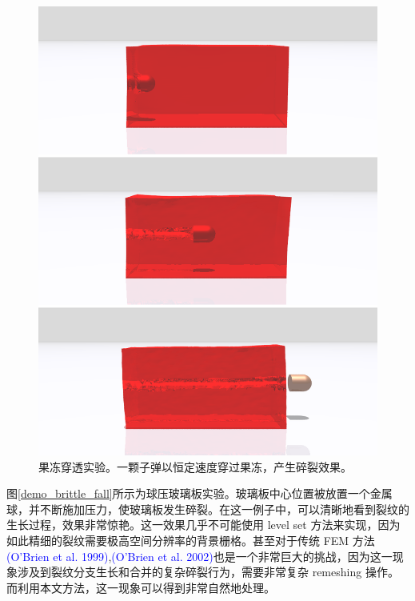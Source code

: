 \begin{figure}[htbp]
\begin{minipage}[t]{0.45\textwidth}
  \includegraphics[width=0.9\linewidth]{chap/image/demo_jello}
  \caption{\label{demo_jello}
           果冻穿透实验。一颗子弹以恒定速度穿过果冻，产生碎裂效果。
          }

\end{minipage}
\end{figure}

图\ref{demo_brittle_fall}所示为球压玻璃板实验。玻璃板中心位置被放置一个金属球，并不断施加压力，使玻璃板发生碎裂。在这一例子中，可以清晰地看到裂纹的生长过程，效果非常惊艳。这一效果几乎不可能使用 level set 方法来实现，因为如此精细的裂纹需要极高空间分辨率的背景栅格。甚至对于传统 FEM 方法\textcolor{blue}{(O'Brien et al. 1999)\parencite{OBrien1999}},\textcolor{blue}{(O'Brien et al. 2002)\parencite{OBrien2002}}也是一个非常巨大的挑战，因为这一现象涉及到裂纹分支生长和合并的复杂碎裂行为，需要非常复杂 remeshing 操作。而利用本文方法，这一现象可以得到非常自然地处理。

